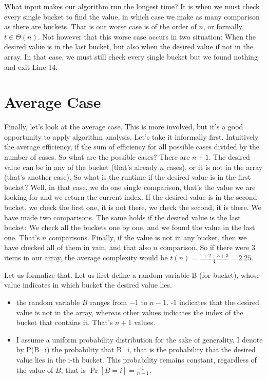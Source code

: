 \documentclass[11pt]{article}
\begin{document}
What input makes our algorithm run the longest time? It is when we
must check every single bucket to find the value, in which case we
make as many comparison as there are buckets. That is our worse case
is of the order of \(n\), or formally, \(t\in \Theta(n)\). Not however
that this worse case occurs in two situation: When the desired
value is in the last bucket, but also when the desired value if
not in the array. In that case, we must still check every single
bucket but we found nothing and exit Line 14.

\section{Average Case}
\label{sec:orga5c3294}

Finally, let's look at the average case. This is more involved,
but it's a good opportunity to apply algorithm analysis. Let's
take it informally first. Intuitively the average efficiency, if
the sum of efficiency for all possible cases divided by the number
of cases. So what are the possible cases?  There are \(n+1\). The
desired value can be in any of the bucket (that's already \(n\)
cases), or it is not in the array (that's another case). So what
is the runtime if the desired value is in the first bucket? Well,
in that case, we do one single comparison, that's the value we are
looking for and we return the current index. If the desired value
is in the second bucket, we check the first one, it is not there,
we check the second, it is there. We have made two
comparisons. The same holds if the desired value is the last
bucket: We check all the buckets one by one, and we found the
value in the last one. That's \(n\) comparisons. Finally, if the
value is not in any bucket, then we have checked all of them in
vain, and that also \(n\) comparison. So if there were 3 items in
our array, the average complexity would be \(t(n) =
  \frac{1+2+3+3}{4} = 2.25\).

Let us formalize that. Let us first define a random variable B (for
bucket), whose value indicates in which bucket the desired value
lies.
\begin{itemize}
\item the random variable \(B\) ranges from \(-1\) to \(n-1\). -1 indicates
that the desired value is not in the array, whereas other values
indicates the index of the bucket that contains it. That's \(n+1\)
values.
\item I assume a uniform probability distribution for the sake of
generality. I denote by P(B=i) the probability that B=i, that is
the probability that the desired value lies in the i-th
bucket. This probability remains constant, regardless of the
value of \(B\), that is \(\Pr[B=i] = \frac{1}{n+1}\).
\end{itemize}
\end{document}
